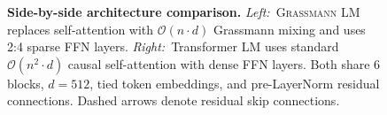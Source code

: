 \documentclass[conference]{IEEEtran}
\newcommand{\grassmann}{\textsc{Grassmann}}
\newcommand{\bigO}[1]{\ensuremath{\mathcal{O}(#1)}}
\begin{document}
\begin{figure}[t]
\caption{%
  \textbf{Side-by-side architecture comparison.}
  \emph{Left:}~\grassmann{} LM replaces self-attention with
  $\bigO{n \cdot d}$ Grassmann mixing and uses 2:4 sparse FFN layers.
  \emph{Right:}~Transformer LM uses standard $\bigO{n^2 \cdot d}$
  causal self-attention with dense FFN layers.
  Both share 6 blocks, $d{=}512$, tied token embeddings,
  and pre-LayerNorm residual connections.
  Dashed arrows denote residual skip connections.%
}
\label{fig:arch-compare}
\end{figure}
\end{document}
